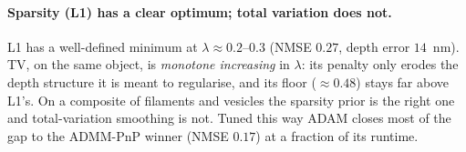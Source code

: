 \paragraph{Sparsity (L1) has a clear optimum; total variation does not.}
\begin{center}\end{center}

\noindent L1 has a well-defined minimum at $\lambda \approx 0.2$--$0.3$ (NMSE $0.27$, depth error
$14$~nm). TV, on the same object, is \emph{monotone increasing} in $\lambda$: its penalty only
erodes the depth structure it is meant to regularise, and its floor ($\approx 0.48$) stays far
above L1's. On a composite of filaments and vesicles the sparsity prior is the right one and
total-variation smoothing is not. Tuned this way ADAM closes most of the gap to the ADMM-PnP
winner (NMSE $0.17$) at a fraction of its runtime.

